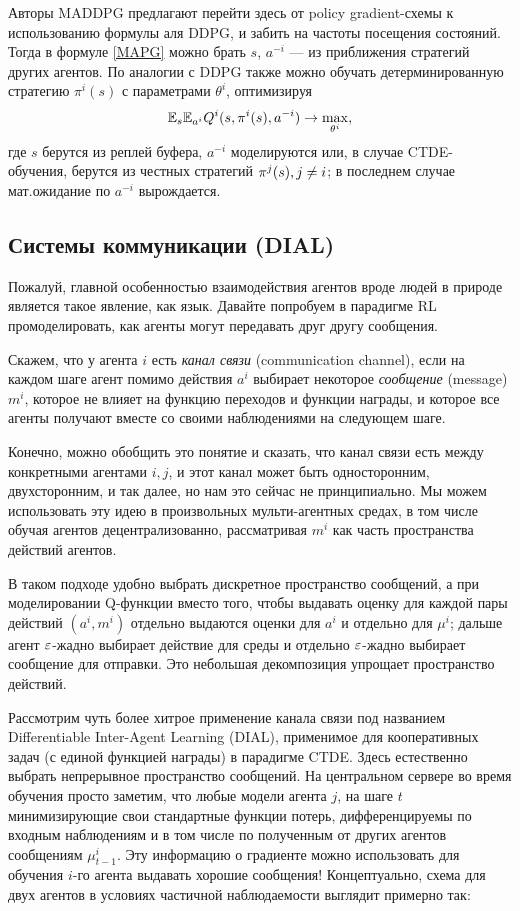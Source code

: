 Авторы MADDPG предлагают перейти здесь от policy gradient-схемы к использованию формулы аля DDPG, и забить на частоты посещения состояний. Тогда в формуле \eqref{MAPG} можно брать $s$, $a^{-i}$ --- из приближения стратегий других агентов. По аналогии с DDPG также можно обучать детерминированную стратегию $\pi^i(s)$ с параметрами $\theta^i$, оптимизируя
$$\mathbb{E}_{s} \mathbb{E}_{a^i} Q^i(s, \pi^i(s), a^{-i}) \to \max_{\theta^i},$$
где $s$ берутся из реплей буфера, $a^{-i}$ моделируются или, в случае CTDE-обучения, берутся из честных стратегий $\pi^j(s), j \HM\ne i$; в последнем случае мат.ожидание по $a^{-i}$ вырождается.

\subsection{Системы коммуникации (DIAL)}

Пожалуй, главной особенностью взаимодействия агентов вроде людей в природе является такое явление, как язык. Давайте попробуем в парадигме RL промоделировать, как агенты могут передавать друг другу сообщения.

\begin{definition}
Скажем, что у агента $i$ есть \emph{канал связи} (communication channel), если на каждом шаге агент помимо действия $a^i$ выбирает некоторое \emph{сообщение} (message) $m^i$, которое не влияет на функцию переходов и функции награды, и которое все агенты получают вместе со своими наблюдениями на следующем шаге.
\end{definition}

Конечно, можно обобщить это понятие и сказать, что канал связи есть между конкретными агентами $i, j$, и этот канал может быть односторонним, двухсторонним, и так далее, но нам это сейчас не принципиально. Мы можем использовать эту идею в произвольных мульти-агентных средах, в том числе обучая агентов децентрализованно, рассматривая $m^i$ как часть пространства действий агентов.

\begin{remark}
В таком подходе удобно выбрать дискретное пространство сообщений, а при моделировании Q-функции вместо того, чтобы выдавать оценку для каждой пары действий $(a^i, m^i)$ отдельно выдаются оценки для $a^i$ и отдельно для $\mu^i$; дальше агент $\varepsilon$-жадно выбирает действие для среды и отдельно $\varepsilon$-жадно выбирает сообщение для отправки. Это небольшая декомпозиция упрощает пространство действий.
\end{remark}

Рассмотрим чуть более хитрое применение канала связи под названием Differentiable Inter-Agent Learning (DIAL), применимое для кооперативных задач (с единой функцией награды) в парадигме CTDE. Здесь естественно выбрать непрерывное пространство сообщений. На центральном сервере во время обучения просто заметим, что любые модели агента $j$, на шаге $t$ минимизирующие свои стандартные функции потерь, дифференцируемы по входным наблюдениям и в том числе по полученным от других агентов сообщениям $\mu^i_{t-1}$. Эту информацию о градиенте можно использовать для обучения $i$-го агента выдавать хорошие сообщения! Концептуально, схема для двух агентов в условиях частичной наблюдаемости выглядит примерно так:

